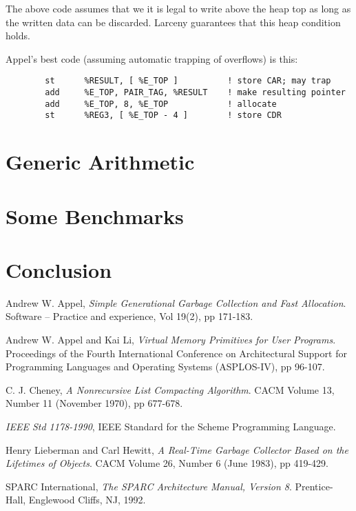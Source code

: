 The above code assumes that we it is legal to write above the heap top
as long as the written data can be discarded. Larceny guarantees that
this heap condition holds.

Appel's best code (assuming automatic trapping of overflows) is this:

\begin{minipage}{\linewidth}
\begin{verbatim}
        st      %RESULT, [ %E_TOP ]          ! store CAR; may trap
        add     %E_TOP, PAIR_TAG, %RESULT    ! make resulting pointer
        add     %E_TOP, 8, %E_TOP            ! allocate
        st      %REG3, [ %E_TOP - 4 ]        ! store CDR
\end{verbatim}
\end{minipage}

\section{Generic Arithmetic}
\label{GenericSection}

\section{Some Benchmarks}
\label{BenchmarksSection}

\section{Conclusion}
\label{ConclusionSection}

\pagebreak
\begin{thebibliography}{99}

Andrew W. Appel, {\em Simple Generational Garbage Collection and Fast 
Allocation}. Software -- Practice and experience, Vol 19(2), pp 171-183.

Andrew W. Appel and Kai Li, {\em Virtual Memory Primitives for User Programs}.
Proceedings of the Fourth International Conference on Architectural Support
for Programming Languages and Operating Systems (ASPLOS-IV), pp 96-107.

C. J. Cheney, {\em A Nonrecursive List Compacting Algorithm}.
CACM Volume 13, Number 11 (November 1970), pp 677-678.

{\em IEEE Std 1178-1990}, IEEE Standard for the Scheme Programming Language.

Henry Lieberman and Carl Hewitt, {\em A Real-Time Garbage Collector Based
on the Lifetimes of Objects}. CACM Volume 26, Number 6 (June 1983), pp 419-429.

SPARC International, {\em The SPARC Architecture Manual, Version 8}.
Prentice-Hall, Englewood Cliffs, NJ, 1992.

\end{thebibliography}



